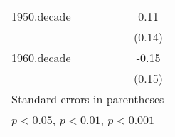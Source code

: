 {\begin{tabular}{l*{5}{c}}
\addlinespace
1950.decade&                  &                  &                  &                  &     0.11         \\
          &                  &                  &                  &                  &   (0.14)         \\
\addlinespace
1960.decade&                  &                  &                  &                  &    -0.15         \\
          &                  &                  &                  &                  &   (0.15)         \\
\bottomrule
\multicolumn{6}{l}{\footnotesize Standard errors in parentheses}\\
\multicolumn{6}{l}{\footnotesize \sym{*} \(p<0.05\), \sym{**} \(p<0.01\), \sym{***} \(p<0.001\)}\\
\end{tabular}
}
